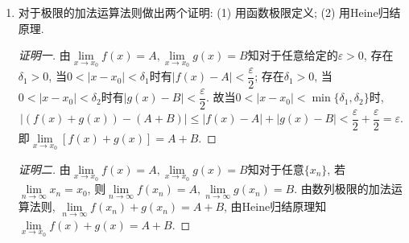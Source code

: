 \documentclass[a4paper,11pt,twoside]{ctexbook}
\begin{document}
\begin{enumerate}
	\item 对于极限的加法运算法则做出两个证明: (1) 用函数极限定义; (2) 用Heine归结原理.
	      \begin{proof}[证明一]
		      由$\lim\limits_{x\to x_0} f(x)=A, \lim\limits_{x\to x_0} g(x)=B$知对于任意给定的$\varepsilon>0$, 存在$\delta_1>0$, 当$0<|x-x_0|<\delta_1$时有$|f(x)-A|<\dfrac{\varepsilon}{2}$; 存在$\delta_1>0$, 当$0<|x-x_0|<\delta_2$时有$|g(x)-B|<\dfrac{\varepsilon}{2}$. 故当$0<|x-x_0|<\min\{\delta_1,\delta_2\}$时,
		      \[
			      |(f(x)+g(x))-(A+B)|\leqslant |f(x)-A|+|g(x)-B|<\dfrac{\varepsilon}{2}+\dfrac{\varepsilon}{2}=\varepsilon.
		      \]
		      即$\lim\limits_{x\to x_0} [f(x)+g(x)]=A+B$. \qedhere
	      \end{proof}
	      \begin{proof}[证明二]
		      由$\lim\limits_{x\to x_0} f(x)=A, \lim\limits_{x\to x_0} g(x)=B$知对于任意$\{x_n\}$, 若$\lim\limits_{n\to\infty} x_n=x_0$, 则$\lim\limits_{n\to\infty} f(x_n)=A, \lim\limits_{n\to\infty} g(x_n)=B$. 由数列极限的加法运算法则, $\lim\limits_{n\to\infty} f(x_n)+g(x_n)=A+B$, 由Heine归结原理知$\lim\limits_{x\to x_0} f(x)+g(x)=A+B$. \qedhere
	      \end{proof}
\end{enumerate}
\end{document}
